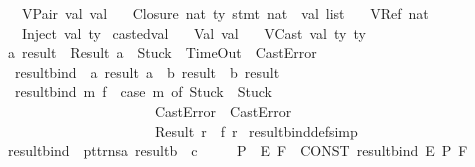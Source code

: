 \begin{isabellebody}
\ \ {\isacharbar}\ VPair\ val\ val\isanewline
\ \ {\isacharbar}\ Closure\ nat\ ty\ stmt\ {\isachardoublequoteopen}{\isacharparenleft}nat\ {\isasymtimes}\ val{\isacharparenright}\ list{\isachardoublequoteclose}\isanewline
\ \ {\isacharbar}\ VRef\ nat\isanewline
\ \ {\isacharbar}\ Inject\ val\ ty\isanewline
\isanewline
{}\isamarkupfalse \ casted{\isacharunderscore}val\isanewline
\ \ {\isacharequal}\ Val\ val\isanewline
\ \ {\isacharbar}\ VCast\ val\ ty\ ty
\isamarkuptrue {}\isamarkupfalse \ {\isacharprime}a\ result\ {\isacharequal}\ Result\ {\isacharprime}a\ {\isacharbar}\ Stuck\ {\isacharbar}\ TimeOut\ {\isacharbar}\ CastError\isanewline
\isanewline
{}\isamarkupfalse \isanewline
\ \ result{\isacharunderscore}bind\ {\isacharcolon}{\isacharcolon}\ {\isachardoublequoteopen}{\isacharbrackleft}{\isacharprime}a\ result{\isacharcomma}\ {\isacharprime}a\ {\isacharequal}{\isachargreater}\ {\isacharprime}b\ result{\isacharbrackright}\ {\isacharequal}{\isachargreater}\ {\isacharprime}b\ result{\isachardoublequoteclose}\ \isanewline
\ \ {\isachardoublequoteopen}result{\isacharunderscore}bind\ m\ f\ {\isacharequal}\ {\isacharparenleft}case\ m\ of\ Stuck\ {\isacharequal}{\isachargreater}\ Stuck\isanewline
\ \ \ \ \ \ \ \ \ \ \ \ \ \ \ \ \ \ \ \ \ {\isacharbar}\ CastError\ {\isasymRightarrow}\ CastError\isanewline
\ \ \ \ \ \ \ \ \ \ \ \ \ \ \ \ \ \ \ \ \ {\isacharbar}\ Result\ r\ {\isacharequal}{\isachargreater}\ f\ r{\isacharparenright}{\isachardoublequoteclose}\isanewline
{}\isamarkupfalse \ result{\isacharunderscore}bind{\isacharunderscore}def{\isacharbrackleft}simp{\isacharbrackright}\isanewline
\isanewline
{}\isamarkupfalse \ {\isachardoublequoteopen}{\isacharunderscore}result{\isacharunderscore}bind{\isachardoublequoteclose}\ {\isacharcolon}{\isacharcolon}\ {\isachardoublequoteopen}{\isacharbrackleft}pttrns{\isacharcomma}{\isacharprime}a\ result{\isacharcomma}{\isacharprime}b{\isacharbrackright}\ {\isacharequal}{\isachargreater}\ {\isacharprime}c{\isachardoublequoteclose}\ {\isacharparenleft}{\isachardoublequoteopen}{\isacharparenleft}{\isacharunderscore}\ {\isacharcolon}{\isacharequal}\ {\isacharunderscore}{\isacharsemicolon}{\isacharslash}{\isacharslash}{\isacharunderscore}{\isacharparenright}{\isachardoublequoteclose}\ {}{\isacharparenright}\isanewline
{}\isamarkupfalse \ {\isachardoublequoteopen}P\ {\isacharcolon}{\isacharequal}\ E{\isacharsemicolon}\ F{\isachardoublequoteclose}\ {\isacharequal}{\isacharequal}\ {\isachardoublequoteopen}CONST\ result{\isacharunderscore}bind\ E\ {\isacharparenleft}{\isacharpercent}P{\isachardot}\ F{\isacharparenright}{\isachardoublequoteclose}\isanewline

\end{isabellebody}
